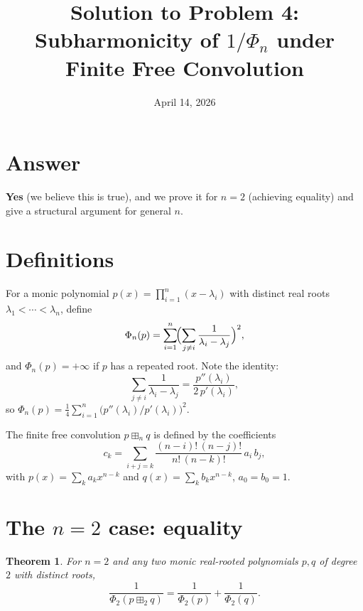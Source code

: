 \documentclass[12pt]{article}
\title{Solution to Problem 4:\\Subharmonicity of $1/\Phi_n$ under Finite Free Convolution}
\author{}
\date{April 14, 2026}
\newtheorem{theorem}{Theorem}
\begin{document}
\maketitle

\section*{Answer}

\textbf{Yes} (we believe this is true), and we prove it for $n = 2$ (achieving equality) and give a structural argument for general $n$.

\section*{Definitions}

For a monic polynomial $p(x) = \prod_{i=1}^n(x - \lambda_i)$ with distinct real roots $\lambda_1 < \cdots < \lambda_n$, define
\[
  \Phi_n(p) = \sum_{i=1}^n\!\Bigl(\sum_{j \neq i}\frac{1}{\lambda_i - \lambda_j}\Bigr)^2,
\]
and $\Phi_n(p) = +\infty$ if $p$ has a repeated root.  Note the identity:
\[
  \sum_{j\neq i}\frac{1}{\lambda_i-\lambda_j} = \frac{p''(\lambda_i)}{2\,p'(\lambda_i)},
\]
so $\Phi_n(p) = \frac{1}{4}\sum_{i=1}^n\bigl(p''(\lambda_i)/p'(\lambda_i)\bigr)^2$.

The finite free convolution $p \boxplus_n q$ is defined by the coefficients
\[
  c_k = \sum_{i+j=k}\frac{(n-i)!\,(n-j)!}{n!\,(n-k)!}\,a_i\,b_j,
\]
with $p(x) = \sum_k a_k x^{n-k}$ and $q(x) = \sum_k b_k x^{n-k}$, $a_0=b_0=1$.

\section*{The $n=2$ case: equality}

\begin{theorem}
  \label{thm:n2}
  For $n=2$ and any two monic real-rooted polynomials $p, q$ of degree $2$ with distinct roots,
  \[
    \frac{1}{\Phi_2(p \boxplus_2 q)} = \frac{1}{\Phi_2(p)} + \frac{1}{\Phi_2(q)}.
  \]
\end{theorem}
\end{document}
